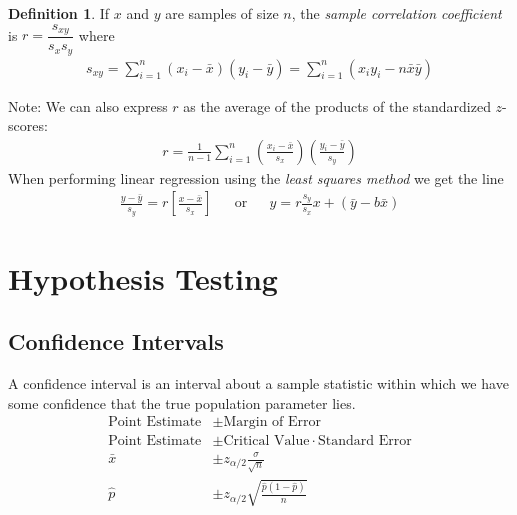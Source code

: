 \documentclass[10pt]{article}
\theoremstyle{definition}
\newtheorem*{definition}{Definition}
\theoremstyle{theorem}
\begin{document}
\begin{definition}
	If \(x\) and \(y\) are samples of size \(n\), the \emph{sample correlation coefficient} is \(r=\dfrac{s_{xy}}{s_x s_y}\) where
	\begin{align*}
		s_{xy} = \sum_{i=1}^{n}(x_i - \bar{x})(y_i - \bar{y}) = \sum_{i=1}^{n}(x_i y_i - n\bar{x}\bar{y})
	\end{align*}
\end{definition}
Note: We can also express \(r\) as the average of the products of the standardized \(z\)-scores:
\begin{align*}
	r = \frac{1}{n-1} \sum_{i=1}^{n} \left( \frac{x_i-\bar{x}}{s_x} \right) \left( \frac{y_i-\bar{y}}{s_y} \right)
\end{align*}
When performing linear regression using the \emph{least squares method} we get the line
\begin{align*}
	\frac{y-\bar{y}}{s_y} = r \left[\frac{x-\bar{x}}{s_x}\right] && \text{or} && y = r\frac{s_y}{s_x}x + (\bar{y}-b\bar{x})
\end{align*}

\section*{Hypothesis Testing}
\subsection*{Confidence Intervals}
A confidence interval is an interval about a sample statistic within which we have some confidence that the true population parameter lies.
\begin{align*}
	\text{Point Estimate}&\pm\text{Margin of Error} \\
	\text{Point Estimate}&\pm\text{Critical Value}\cdot\text{Standard Error} \\
	\bar{x} &\pm z_{\alpha/2}\frac{\sigma}{\sqrt{n}} \\
	\hat{p} &\pm z_{\alpha/2}\sqrt{\frac{\hat{p}(1-\hat{p})}{n}}
\end{align*}
\end{document}
